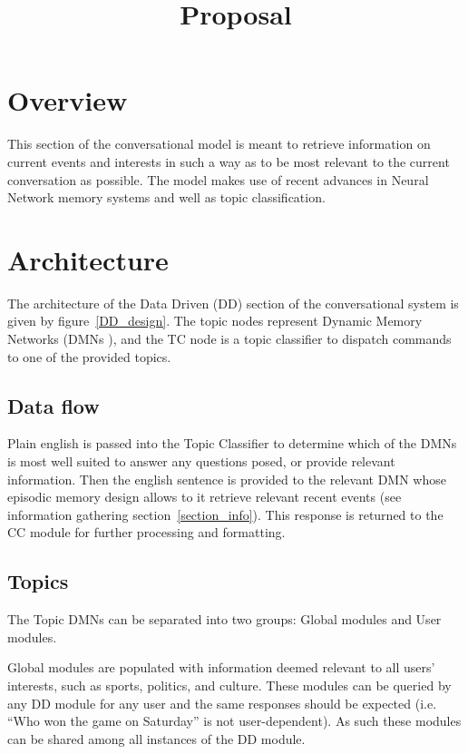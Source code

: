\documentclass[12pt]{article}
\title{Proposal}
\author{}
\date{} %
\begin{document}
\maketitle

\section{Overview}
This section of the conversational model is meant to retrieve information on current events and interests in such a way as to be most relevant to the current conversation as possible. The model makes use of recent advances in Neural Network memory systems and well as topic classification.

\section{Architecture}
The architecture of the Data Driven (DD) section of the conversational system is given by figure~\ref{DD_design}. The topic nodes represent Dynamic Memory Networks (DMNs \cite{Kumar:2015ys}), and the TC node is a topic classifier to dispatch commands to one of the provided topics. 

\subsection{Data flow}
Plain english is passed into the Topic Classifier to determine which of the DMNs is most well suited to answer any questions posed, or provide relevant information. Then the english sentence is provided to the relevant DMN whose episodic memory design allows to it retrieve relevant recent events (see information gathering section~\ref{section_info}). This response is returned to the CC module for further processing and formatting.

\subsection{Topics}
The Topic DMNs can be separated into two groups: Global modules and User modules. 

\noindent
Global modules are populated with information deemed relevant to all users' interests, such as sports, politics, and culture. These modules can be queried by any DD module for any user and the same responses should be expected (i.e. ``Who won the game on Saturday'' is not user-dependent). As such these modules can be shared among all instances of the DD module.
\end{document}
